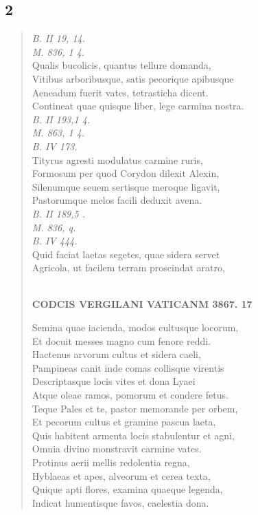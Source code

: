 \documentclass[11pt, a4paper]{report}
\begin{document}
            \subsection*{2}
      \begin{verse}
      \textit{B. II 19, 14.} \\ \textit{M. 836, 1 4.} \\ Qualis bucolicis, quantus tellure domanda, \\ Vitibus arboribusque, satis pecorique apibusque \\ Aeneadum fuerit vates, tetrasticha dicent. \\ Contineat quae quisque liber, lege carmina nostra. \\ \textit{B. II 193,1 4.} \\ \textit{M. 863, 1 4.} \\ \textit{B. IV 173.} \\ Tityrus agresti modulatus carmine ruris, \\ Formosum per quod Corydon dilexit Alexin, \\ Silenumque seuem sertisque meroque ligavit, \\ Pastorumque melos facili deduxit avena. \\ \textit{B. II 189,5 .} \\ \textit{M. 836, q.} \\ \textit{B. IV 444.} \\ Quid faciat laetas segetes, quae sidera servet \\ Agricola, ut facilem terram proscindat aratro, \\ 
        ﻿\pagebreak 
    \begin{center} \textbf{CODCIS VERGILANI VATICANM 3867. 17} \end{center}Semina quae iacienda, modos cultusque locorum, \\ Et docuit messes magno cum fenore reddi. \\ Hactenus arvorum cultus et sidera caeli, \\ Pampineas canit inde comas collisque virentis \\ Descriptasque locis vites et dona Lyaei \\ Atque oleae ramos, pomorum et condere fetus. \\ Teque Pales et te, pastor memorande per orbem, \\ Et pecorum cultus et gramine pascua laeta, \\ Quis habitent armenta locis stabulentur et agni, \\ Omnia divino monstravit carmine vates. \\ Protinus aerii mellis redolentia regna, \\ Hyblaeas et apes, alveorum et cerea texta, \\ Quique apti flores, examina quaeque legenda, \\ Indicat humentisque favos, caelestia dona. \\ 
      \end{verse}
  
\end{document}
